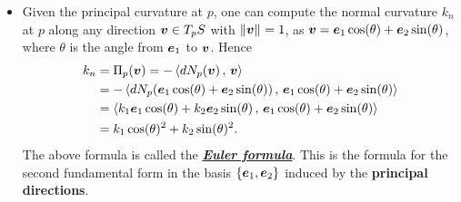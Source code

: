 \documentclass[11pt]{article}
\begin{document}
\begin{itemize}
\item Given the principal curvature at $p$, one can compute the normal curvature $k_{n}$ at $p$ along any direction $\boldsymbol{v}\in T_{p}S$ with $\left\|\boldsymbol{v}\right\|_{} = 1$, as $\boldsymbol{v} = \boldsymbol{e}_{1}\cos(\theta) + \boldsymbol{e}_{2}\sin(\theta)$, where $\theta$ is the angle from $\boldsymbol{e}_{1}$ to $\boldsymbol{v}$. Hence
\begin{align}
k_{n} &= \Pi_{p}(\boldsymbol{v}) = -\left\langle dN_{p}(\boldsymbol{v})\,,\, \boldsymbol{v} \right\rangle\nonumber\\
&= -\left\langle dN_{p}( \boldsymbol{e}_{1}\cos(\theta) + \boldsymbol{e}_{2}\sin(\theta))\,,\,  \boldsymbol{e}_{1}\cos(\theta) + \boldsymbol{e}_{2}\sin(\theta) \right\rangle\nonumber\\
&= \left\langle k_{1}\boldsymbol{e}_{1}\cos(\theta) + k_{2}\boldsymbol{e}_{2}\sin(\theta)\,,\, \boldsymbol{e}_{1}\cos(\theta) + \boldsymbol{e}_{2}\sin(\theta) \right\rangle\nonumber\\
&= k_{1}\cos(\theta)^{2} + k_{2}\sin(\theta)^{2}. \label{eqn: Euler_formula}
\end{align}
The above formula is called the \underline{\emph{\textbf{Euler formula}}}. This is the formula for the second fundamental form in the basis $\left\{\boldsymbol{e}_{1}, \boldsymbol{e}_{2}\right\}$ induced by the \textbf{principal directions}. 
\end{itemize}
\end{document}
